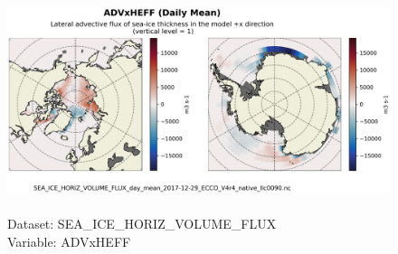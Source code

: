 \begin{figure}[H]
\centering
\includegraphics[scale=0.5]{../images/plots/native_plots/Sea-Ice_and_Snow_Horizontal_Volume_Fluxes/ADVxHEFF.png}
\caption{\\Dataset: SEA\_ICE\_HORIZ\_VOLUME\_FLUX\\Variable: ADVxHEFF}
\label{tab:table-SEA_ICE_HORIZ_VOLUME_FLUX_ADVxHEFF-Plot}
\end{figure}
\pagebreak
